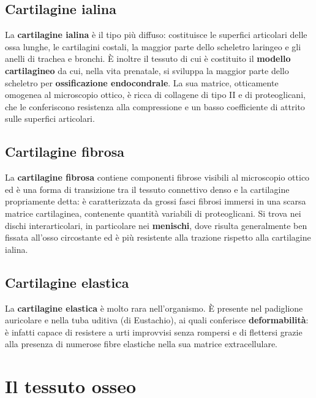 \subsection{Cartilagine ialina}

La \textbf{cartilagine ialina} è il tipo più diffuso: costituisce le
superfici articolari delle ossa lunghe, le cartilagini costali, la maggior
parte dello scheletro laringeo e gli anelli di trachea e bronchi. È inoltre
il tessuto di cui è costituito il \textbf{modello cartilagineo} da cui, nella
vita prenatale, si sviluppa la maggior parte dello scheletro per
\textbf{ossificazione endocondrale}. La sua matrice, otticamente omogenea al
microscopio ottico, è ricca di collagene di tipo II e di proteoglicani, che le
conferiscono resistenza alla compressione e un basso coefficiente di attrito
sulle superfici articolari.

\subsection{Cartilagine fibrosa}

La \textbf{cartilagine fibrosa} contiene componenti fibrose visibili al
microscopio ottico ed è una forma di transizione tra il tessuto connettivo
denso e la cartilagine propriamente detta: è caratterizzata da grossi fasci
fibrosi immersi in una scarsa matrice cartilaginea, contenente quantità
variabili di proteoglicani. Si trova nei dischi
interarticolari, in particolare nei \textbf{menischi}, dove risulta
generalmente ben fissata all'osso circostante ed è più resistente alla
trazione rispetto alla cartilagine ialina.

\subsection{Cartilagine elastica}

La \textbf{cartilagine elastica} è molto rara nell'organismo. È presente nel
padiglione auricolare e nella tuba uditiva (di Eustachio), ai quali conferisce
\textbf{deformabilità}: è infatti capace di resistere a urti improvvisi senza
rompersi e di flettersi grazie alla presenza di numerose fibre elastiche
nella sua matrice extracellulare.

\section{Il tessuto osseo}

